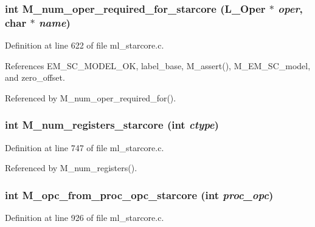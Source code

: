 \subsubsection{\setlength{\rightskip}{0pt plus 5cm}int M\_\-num\_\-oper\_\-required\_\-for\_\-starcore (L\_\-Oper $\ast$ {\em oper}, char $\ast$ {\em name})}\label{ml__starcore_8c_51e99e7bb8f7f26f61297f566b3faede}




Definition at line 622 of file ml\_\-starcore.c.

References EM\_\-SC\_\-MODEL\_\-OK, label\_\-base, M\_\-assert(), M\_\-EM\_\-SC\_\-model, and zero\_\-offset.

Referenced by M\_\-num\_\-oper\_\-required\_\-for().
\subsubsection{\setlength{\rightskip}{0pt plus 5cm}int M\_\-num\_\-registers\_\-starcore (int {\em ctype})}\label{ml__starcore_8c_58eed033ec1c25bf3526aa3c5a607829}




Definition at line 747 of file ml\_\-starcore.c.

Referenced by M\_\-num\_\-registers().
\subsubsection{\setlength{\rightskip}{0pt plus 5cm}int M\_\-opc\_\-from\_\-proc\_\-opc\_\-starcore (int {\em proc\_\-opc})}\label{ml__starcore_8c_8dcb2892a44c63d537237a3b93236df3}




Definition at line 926 of file ml\_\-starcore.c.

